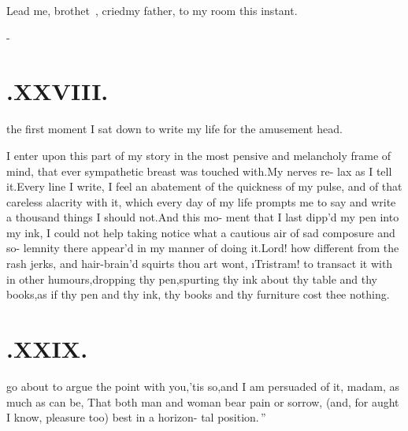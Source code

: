 \documentclass[twoside]{article}
\begin{document}
\tsh Lead me, brothet\sic\ \toby, cried\break my father, to
my room this instant.

\vfill
{}\newpage

\null\kern-\baselineskip
\section{.\quad  XXVIII.}

 the first moment I sat down\break
to write my life for the amusement\break
{}
head.

I enter upon this part of my story in the most pensive and
melancholy frame of mind, that ever sympathetic breast\break
was touched with.\tsh My nerves re-\break
lax as I tell it.\tsh Every line I write,\break
I feel an abatement of the quickness of
my pulse, and of that careless alacrity\break
with it, which every day of my life\break
prompts me to say and write a thousand\break
things I should not.\tsh And this mo-\break
ment that I last dipp’d my pen into my\break
ink, I could not help taking notice what\break
a cautious air of sad composure and so-\break
lemnity there appear’d in my manner of\break
doing it.\tsh Lord! how different from\break
the rash jerks, and hair-brain’d squirts\break
thou art wont, \i{Tristram!} to transact it\break
with in other humours,\tsk dropping thy\break
pen,\tsk spurting thy ink about thy table\break
and thy books,\tsh as if thy pen and thy\break
ink, thy books and thy furniture cost\break
thee nothing.

\section{.\quad  XXIX.}

 go about to argue the\break
point with you,\tsk ’tis so,\tsk and
I am persuaded of it, madam, as much\break
as can be, \lqq That both man and woman\break
\lqq bear pain or sorrow, (and, for aught I\break
\lqq know, pleasure too) best in a horizon-\break
\lqq tal position.\,”
\end{document}
